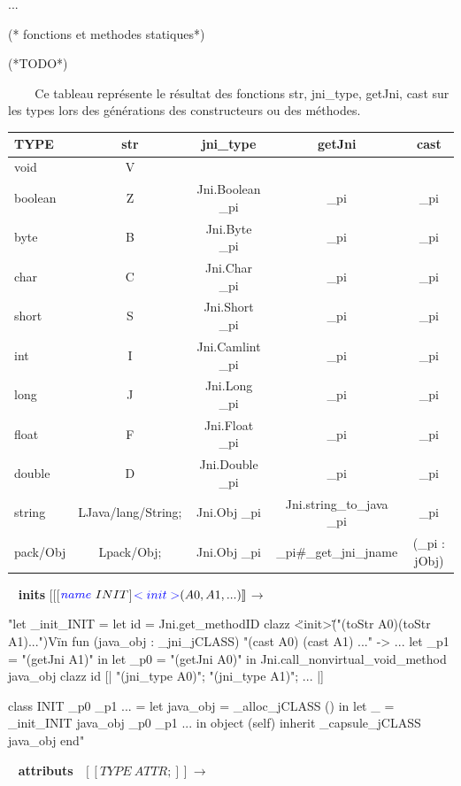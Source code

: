 \documentclass[a4paper, 11pt, notitlepage]{article}
\begin{document}
...
\begin{OCaml}
(* fonctions et  methodes statiques*)
 
    (*TODO*)

\end{OCaml}


\
\ 
\newline
\ 
\newline
Ce tableau représente le résultat des fonctions str, jni\_type, getJni, cast sur les types lors des générations des constructeurs ou des méthodes.

\noindent
\begin{tabular}{|l|c|c|c|c|}
  \hline
  TYPE & str & jni\_type & getJni & cast \\
  \hline
  void & V & & & \\
  boolean & Z & Jni.Boolean \_pi & \_pi  & \_pi \\
  byte & B & Jni.Byte \_pi & \_pi & \_pi \\
  char & C & Jni.Char \_pi & \_pi & \_pi \\
  short & S & Jni.Short \_pi & \_pi & \_pi  \\
  int & I & Jni.Camlint \_pi & \_pi &  \_pi \\
  long & J & Jni.Long \_pi &\_pi  & \_pi \\
  float & F & Jni.Float \_pi & \_pi & \_pi \\
  double & D & Jni.Double \_pi & \_pi & \_pi \\
  string &LJava/lang/String;& Jni.Obj \_pi & Jni.string\_to\_java \_pi & \_pi \\
  pack/Obj& Lpack/Obj;& Jni.Obj \_pi & \_pi\#\_get\_jni\_jname & (\_pi : jObj) \\
  \hline
\end{tabular}
\ 
\newline
\noindent
\textbf{ inits }
\newline
\noindent
$[\![$[$ {\color{blue}name}\ INIT $]${\color{blue} <init>} (A0,
    A1, ...)]\!]_{}$$\longrightarrow$

\begin{OCaml}
"let _init_INIT =
  let id = Jni.get_methodID clazz \"<init>\" 
            \"("(toStr A0)(toStr A1)...")V\"
  in
    fun (java_obj : _jni_jCLASS) "(cast A0) (cast A1) ..." -> ...
      let _p1 = "(getJni A1)" in
      let _p0 = "(getJni A0)" in
      Jni.call_nonvirtual_void_method java_obj clazz id 
          [| "(jni\_type A0)"; "(jni\_type A1)"; ... |]

class INIT _p0 _p1 ... =
  let java_obj = _alloc_jCLASS ()
  in let _ = _init_INIT java_obj _p0 _p1 ...
    in object (self) inherit _capsule_jCLASS java_obj 
end"

\end{OCaml}
\ 
\newline
\noindent
\textbf{ attributs }
\newline
\noindent
\ 
$[\![ TYPE\ ATTR; ]\!]_{}$$\longrightarrow$
\end{document}
